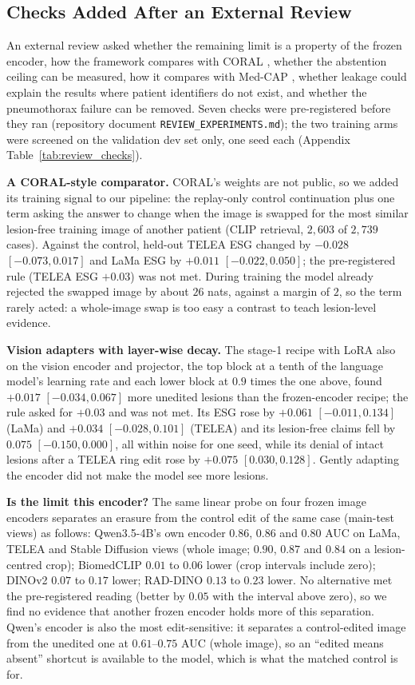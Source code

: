 \documentclass[5p,times,twocolumn,authoryear]{elsarticle}
\begin{document}
\subsection{Checks Added After an External Review}
\label{subsec:exp_review}
An external review asked whether the remaining limit is a property of the frozen encoder, how the framework compares with CORAL \citep{zafar2026coral}, whether the abstention ceiling can be measured, how it compares with Med-CAP \citep{huang2026medcap}, whether leakage could explain the results where patient identifiers do not exist, and whether the pneumothorax failure can be removed. Seven checks were pre-registered before they ran (repository document \texttt{REVIEW\_EXPERIMENTS.md}); the two training arms were screened on the validation dev set only, one seed each (Appendix Table~\ref{tab:review_checks}).

\textbf{A CORAL-style comparator.} CORAL's weights are not public, so we added its training signal to our pipeline: the replay-only control continuation plus one term asking the answer to change when the image is swapped for the most similar lesion-free training image of another patient (CLIP retrieval, $2{,}603$ of $2{,}739$ cases). Against the control, held-out TELEA ESG changed by $-0.028$ $[-0.073, 0.017]$ and LaMa ESG by $+0.011$ $[-0.022, 0.050]$; the pre-registered rule (TELEA ESG $+0.03$) was not met. During training the model already rejected the swapped image by about $26$ nats, against a margin of $2$, so the term rarely acted: a whole-image swap is too easy a contrast to teach lesion-level evidence.

\textbf{Vision adapters with layer-wise decay.} The stage-1 recipe with LoRA also on the vision encoder and projector, the top block at a tenth of the language model's learning rate and each lower block at $0.9$ times the one above, found $+0.017$ $[-0.034, 0.067]$ more unedited lesions than the frozen-encoder recipe; the rule asked for $+0.03$ and was not met. Its ESG rose by $+0.061$ $[-0.011, 0.134]$ (LaMa) and $+0.034$ $[-0.028, 0.101]$ (TELEA) and its lesion-free claims fell by $0.075$ $[-0.150, 0.000]$, all within noise for one seed, while its denial of intact lesions after a TELEA ring edit rose by $+0.075$ $[0.030, 0.128]$. Gently adapting the encoder did not make the model see more lesions.

\textbf{Is the limit this encoder?} The same linear probe on four frozen image encoders separates an erasure from the control edit of the same case (main-test views) as follows: Qwen3.5-4B's own encoder $0.86$, $0.86$ and $0.80$ AUC on LaMa, TELEA and Stable Diffusion views (whole image; $0.90$, $0.87$ and $0.84$ on a lesion-centred crop); BiomedCLIP $0.01$ to $0.06$ lower (crop intervals include zero); DINOv2 $0.07$ to $0.17$ lower; RAD-DINO $0.13$ to $0.23$ lower. No alternative met the pre-registered reading (better by $0.05$ with the interval above zero), so we find no evidence that another frozen encoder holds more of this separation. Qwen's encoder is also the most edit-sensitive: it separates a control-edited image from the unedited one at $0.61$--$0.75$ AUC (whole image), so an ``edited means absent'' shortcut is available to the model, which is what the matched control is for.
\end{document}
